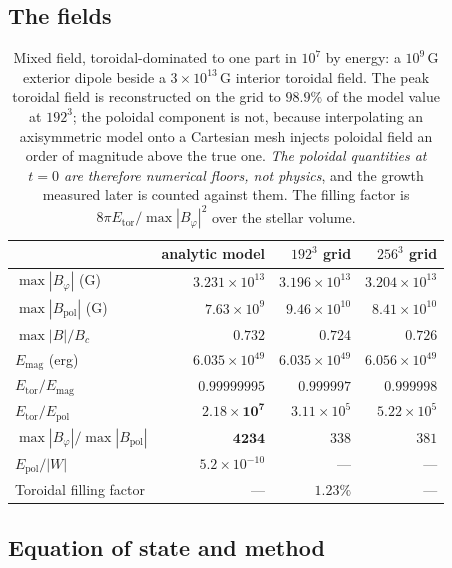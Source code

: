 \documentclass[11pt,a4paper]{article}
\newcommand{\Btor}{B_\varphi}
\newcommand{\Bpol}{B_{\mathrm{pol}}}
\newcommand{\Etor}{E_{\mathrm{tor}}}
\newcommand{\Epol}{E_{\mathrm{pol}}}
\newcommand{\Emag}{E_{\mathrm{mag}}}
\begin{document}
\subsection{The fields}

\begin{table}[h]
\centering\small
\begin{tabular}{lrrr}
\toprule
& analytic model & $192^3$ grid & $256^3$ grid \\
\midrule
$\max|\Btor|$ (G) & $3.231\times10^{13}$ & $3.196\times10^{13}$ & $3.204\times10^{13}$ \\
$\max|\Bpol|$ (G) & $7.63\times10^{9}$ & $9.46\times10^{10}$ & $8.41\times10^{10}$ \\
$\max|B|/B_c$ & $0.732$ & $0.724$ & $0.726$ \\
\midrule
$\Emag$ (erg) & $6.035\times10^{49}$ & $6.035\times10^{49}$ & $6.056\times10^{49}$ \\
$\Etor/\Emag$ & $0.99999995$ & $0.999997$ & $0.999998$ \\
$\Etor/\Epol$ & $\mathbf{2.18\times10^{7}}$ & $3.11\times10^{5}$ & $5.22\times10^{5}$ \\
$\max|\Btor|/\max|\Bpol|$ & $\mathbf{4234}$ & $338$ & $381$ \\
\midrule
$\Epol/|W|$ & $5.2\times10^{-10}$ & --- & --- \\
Toroidal filling factor & --- & $1.23\%$ & --- \\
\bottomrule
\end{tabular}
\caption{Mixed field, toroidal-dominated to one part in $10^7$ by energy: a
$10^9$\,G exterior dipole beside a $3\times10^{13}$\,G interior toroidal field.
The peak toroidal field is reconstructed on the grid to $98.9\%$ of the model
value at $192^3$; the poloidal component is not, because interpolating an
axisymmetric model onto a Cartesian mesh injects poloidal field an order of
magnitude above the true one. \emph{The poloidal quantities at $t=0$ are
therefore numerical floors, not physics}, and the growth measured later is
counted against them. The filling factor is
$8\pi\Etor/\max|\Btor|^2$ over the stellar volume.}
\end{table}

\subsection{Equation of state and method}
\end{document}
